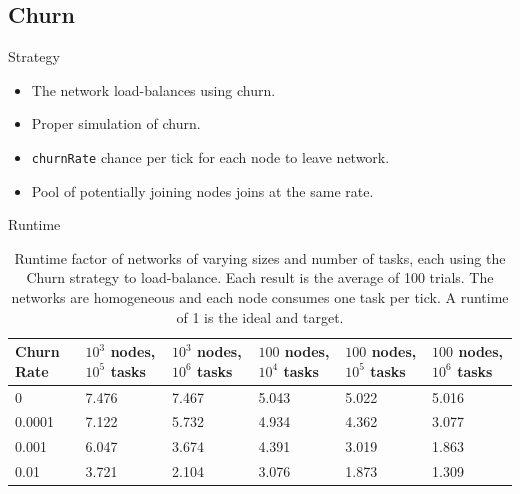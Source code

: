 \documentclass[11pt]{beamer}
\begin{document}
\subsection{Churn}
\begin{frame}{Strategy}
	\begin{itemize}
		
		\item The network load-balances using churn.
		\item Proper simulation of churn.
		\item \texttt{churnRate} chance per tick for each node to leave network.
		\item Pool of potentially joining nodes joins at the same rate.
	\end{itemize}
\end{frame}



\begin{frame}{Runtime}
	\begin{table}[h]
		\small
		\centering
		\caption[Churn Runtimes in a homogenious network]{Runtime factor of networks of varying sizes and number of tasks, each using the Churn strategy to load-balance.  Each result is the average of 100 trials. The networks are homogeneous and each node consumes one task per tick.  A runtime of 1 is the ideal and target.}
		\begin{tabular}{|p{1cm} || p{1cm} | p{1cm} | p{1cm} | p{1cm} | p{1cm} |}
			\hline
			Churn Rate & $ 10^{3}$ nodes, $ 10^{5}$ tasks & $ 10^{3}$ nodes, $ 10^{6}$ tasks & $ 100$ nodes, $ 10^{4}$ tasks & $ 100$ nodes, $ 10^{5}$ tasks &$ 100$ nodes, $ 10^{6}$ tasks \\ \hline
			0      & 7.476   &  7.467 &  5.043& 5.022 &5.016 \\\hline
			0.0001 & 7.122   &  5.732 &  4.934& 4.362&3.077 \\\hline
			0.001  & 6.047   &  3.674 &  4.391& 3.019  &1.863\\\hline
			0.01  &  3.721   &  2.104 &  3.076& 1.873 &1.309\\\hline
			
		\end{tabular}
		\label{tab:ChurnRuntimesHomogenious}
	\end{table}
\end{frame}
\end{document}
